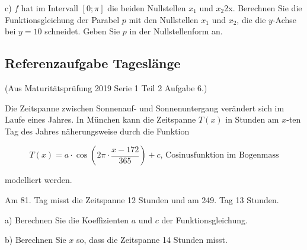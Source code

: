 c) $f$ hat im Intervall $[0; \pi]$ die beiden Nullstellen $x_1$ und $x_2$2x. Berechnen Sie die Funktionsgleichung der Parabel $p$ mit den Nullstellen $x_1$ und $x_2$, die die $y$-Achse bei $y=10$ schneidet. Geben Sie $p$ in der Nullstellenform an.

\newpage

\subsection{Referenzaufgabe Tageslänge}
(Aus Maturitätsprüfung 2019 Serie 1 Teil 2 Aufgabe 6.)

Die Zeitspanne zwischen Sonnenauf- und Sonnenuntergang verändert sich im Laufe eines Jahres.
In München kann die Zeitspanne $T(x)$ in Stunden am $x$-ten Tag des Jahres näherungsweise durch die Funktion

$$T(x) = a\cdot{}\cos\left( 2\pi\cdot{}\frac{x-172}{365}\right) + c\textrm{, Cosinusfunktion im Bogenmass}$$

modelliert werden.

Am 81. Tag misst die Zeitspanne 12 Stunden und am 249. Tag 13 Stunden.

a) Berechnen Sie die Koeffizienten $a$ und $c$ der Funktionsgleichung.

b)  Berechnen Sie $x$ so, dass die Zeitspanne 14 Stunden misst.

